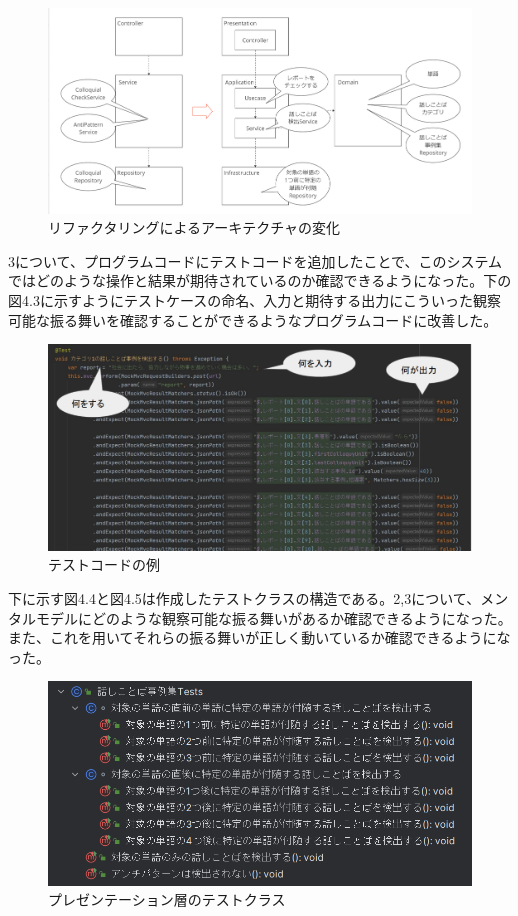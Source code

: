 \documentclass[12pt, a4paper]{jreport}
\begin{document}
\begin{figure}[H]
\centering
\includegraphics[width=1\linewidth]{image/kaizen1.png}
\caption{リファクタリングによるアーキテクチャの変化}
\label{fig:enter-label}
\end{figure}
3について、プログラムコードにテストコードを追加したことで、このシステムではどのような操作と結果が期待されているのか確認できるようになった。下の図4.3に示すようにテストケースの命名、入力と期待する出力にこういった観察可能な振る舞いを確認することができるようなプログラムコードに改善した。
\begin{figure}[H]
\centering
\includegraphics[width=1\linewidth]{image/kaizen3.png}
\caption{テストコードの例}
\label{fig:enter-label}
\end{figure}
下に示す図4.4と図4.5は作成したテストクラスの構造である。2,3について、メンタルモデルにどのような観察可能な振る舞いがあるか確認できるようになった。また、これを用いてそれらの振る舞いが正しく動いているか確認できるようになった。
\begin{figure}[H]
\centering
\includegraphics[width=1\linewidth]{image/presenTest.png}
\caption{プレゼンテーション層のテストクラス}
\label{fig:enter-label}
\end{figure}
\end{document}
